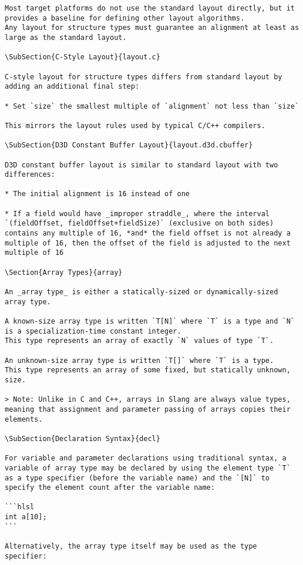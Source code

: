 \begin{verbatim}
Most target platforms do not use the standard layout directly, but it provides a baseline for defining other layout algorithms.
Any layout for structure types must guarantee an alignment at least as large as the standard layout.

\SubSection{C-Style Layout}{layout.c}

C-style layout for structure types differs from standard layout by adding an additional final step:

* Set `size` the smallest multiple of `alignment` not less than `size`

This mirrors the layout rules used by typical C/C++ compilers.

\SubSection{D3D Constant Buffer Layout}{layout.d3d.cbuffer}

D3D constant buffer layout is similar to standard layout with two differences:

* The initial alignment is 16 instead of one

* If a field would have _improper straddle_, where the interval `(fieldOffset, fieldOffset+fieldSize)` (exclusive on both sides) contains any multiple of 16, *and* the field offset is not already a multiple of 16, then the offset of the field is adjusted to the next multiple of 16

\Section{Array Types}{array}

An _array type_ is either a statically-sized or dynamically-sized array type.

A known-size array type is written `T[N]` where `T` is a type and `N` is a specialization-time constant integer.
This type represents an array of exactly `N` values of type `T`.

An unknown-size array type is written `T[]` where `T` is a type.
This type represents an array of some fixed, but statically unknown, size.

> Note: Unlike in C and C++, arrays in Slang are always value types, meaning that assignment and parameter passing of arrays copies their elements.

\SubSection{Declaration Syntax}{decl}

For variable and parameter declarations using traditional syntax, a variable of array type may be declared by using the element type `T` as a type specifier (before the variable name) and the `[N]` to specify the element count after the variable name:

```hlsl
int a[10];
```

Alternatively, the array type itself may be used as the type specifier:


\end{verbatim}
